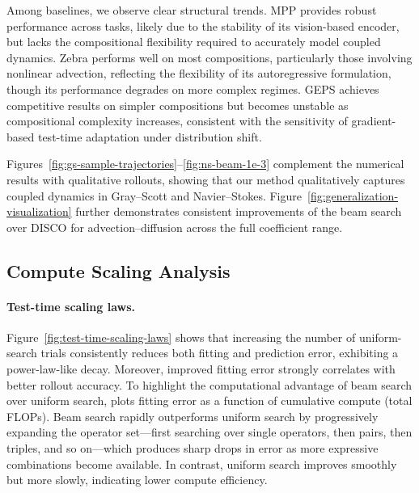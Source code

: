 \documentclass{article}
\theoremstyle{plain}
\theoremstyle{definition}
\theoremstyle{remark}
\begin{document}
Among baselines, we observe clear structural trends. MPP provides robust performance across tasks, likely due to the stability of its vision-based encoder, but lacks the compositional flexibility required to accurately model coupled dynamics. Zebra performs well on most compositions, particularly those involving nonlinear advection, reflecting the flexibility of its autoregressive formulation, though its performance degrades on more complex regimes. GEPS achieves competitive results on simpler compositions but becomes unstable as compositional complexity increases, consistent with the sensitivity of gradient-based test-time adaptation under distribution shift.

Figures~\ref{fig:gs-sample-trajectories}–\ref{fig:ns-beam-1e-3} complement the numerical results with qualitative rollouts, showing that our method qualitatively captures coupled dynamics in Gray--Scott and Navier--Stokes. Figure~\ref{fig:generalization-visualization} further demonstrates consistent improvements of the beam search over DISCO for advection--diffusion across the full coefficient range.

\subsection{Compute Scaling Analysis}
\label{subsection-scaling-analysis}


\paragraph{Test-time scaling laws.}
Figure~\ref{fig:test-time-scaling-laws} shows that increasing the number of uniform-search trials consistently reduces both fitting and prediction error, exhibiting a power-law-like decay. Moreover, improved fitting error strongly correlates with better rollout accuracy. To highlight the computational advantage of beam search over uniform search,  plots fitting error as a function of cumulative compute (total FLOPs). Beam search rapidly outperforms uniform search by progressively expanding the operator set—first searching over single operators, then pairs, then triples, and so on—which produces sharp drops in error as more expressive combinations become available. In contrast, uniform search improves smoothly but more slowly, indicating lower compute efficiency.
\end{document}
